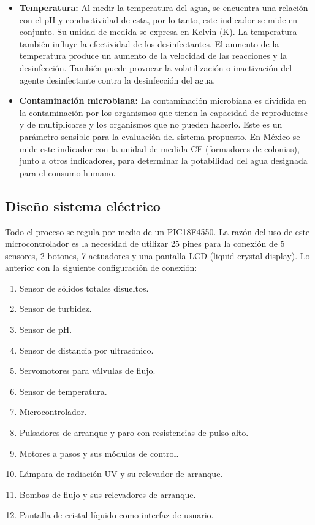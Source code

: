 \documentclass[conference]{IEEEtran}
\begin{document}
\begin{itemize}
		\item \textbf{Temperatura:} Al medir la temperatura del agua, se encuentra una relación con el pH y conductividad de esta, por lo tanto, este indicador se mide en conjunto. Su unidad de medida se expresa en Kelvin (K). La temperatura también influye la efectividad de los desinfectantes. El aumento de la temperatura produce un aumento de la velocidad de las reacciones y la desinfección. También puede provocar la volatilización o inactivación del agente desinfectante contra la desinfección del agua.
	
		\item \textbf{Contaminación microbiana:} La contaminación microbiana es dividida en la contaminación por los organismos que tienen la capacidad de reproducirse y de multiplicarse y los organismos que no pueden hacerlo. Este es un parámetro sensible para la evaluación del sistema propuesto. En México se mide este indicador con la unidad de medida CF (formadores de colonias), junto a otros indicadores, para determinar la potabilidad del agua designada para el consumo humano.
	
	\end{itemize}
	
\subsection{Diseño sistema eléctrico}

Todo el proceso se regula por medio de un PIC18F4550. La razón del uso de este microcontrolador es la necesidad de utilizar 25 pines para la conexión de 5 sensores, 2 botones, 7 actuadores y una pantalla LCD (liquid-crystal display). Lo anterior con la siguiente configuración de conexión:

\begin{enumerate}
	\item Sensor de sólidos totales disueltos.
	\item Sensor de turbidez.
	\item Sensor de pH.
	\item Sensor de distancia por ultrasónico.
	\item Servomotores para válvulas de flujo.
	\item Sensor de temperatura.
	\item Microcontrolador.
	\item Pulsadores de arranque y paro con resistencias de pulso alto.
	\item Motores a pasos y sus módulos de control.
	\item Lámpara de radiación UV y su relevador de arranque.
	\item Bombas de flujo y sus relevadores de arranque.
	\item Pantalla de cristal líquido como interfaz de usuario.
\end{enumerate}
\end{document}
